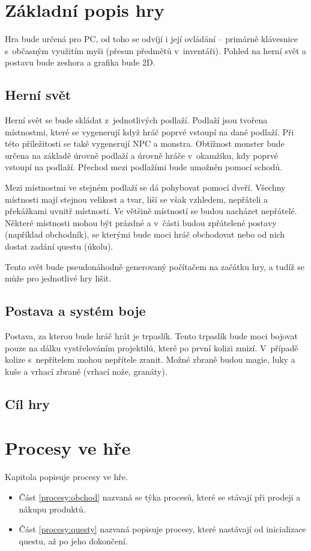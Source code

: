 \documentclass[12pt,a4paper]{article}
\begin{document}

\section{Základní popis hry}
Hra bude určená pro PC, od toho se odvíjí i její ovládání -- primárně klávesnice
s~občasným využitím myši (přesun předmětů v~inventáři). Pohled na herní svět a
postavu bude zeshora a grafika bude 2D.

\subsection{Herní svět}
Herní svět se bude skládat z~jednotlivých podlaží. Podlaží jsou tvořena
místnostmi, které se vygenerují když hráč poprvé vstoupí na dané podlaží. Při
této příležitosti se také vygenerují NPC a monstra. Obtížnost monster bude
určena na základě úrovně podlaží a úrovně hráče v~okamžiku, kdy poprvé vstoupí
na podlaží. Přechod mezi podlažími bude umožněn pomocí schodů.

Mezi místnostmi ve stejném podlaží se dá pohybovat pomocí dveří. Všechny
místnosti mají stejnou velikost a tvar, liší se však vzhledem, nepřáteli a
překážkami uvnitř místnosti. Ve většině místností se budou nacházet nepřátelé.
Některé místnosti mohou být prázdné a v~části budou zpřátelené postavy (například
obchodník), se kterými bude moci hráč obchodovat nebo od nich dostat zadání
questu (úkolu).

Tento svět bude pseudonáhodně generovaný počítačem na začátku hry, a tudíž se
může pro jednotlivé hry lišit.

\subsection{Postava a systém boje}
Postava, za kterou bude hráč hrát je trpaslík. Tento trpaslík bude moci bojovat
pouze na dálku vystřelováním projektilů, které po první kolizi zmizí. V~případě
kolize s~nepřítelem mohou nepřítele zranit. Možné zbraně budou magie, luky a
kuše a vrhací zbraně (vrhací nože, granáty).

\subsection{Cíl hry}




\section{Procesy ve hře}
Kapitola popisuje procesy ve hře.
\begin{itemize}
  \item{Část \ref{procesy:obchod} nazvaná  se týka procesů,
    které se stávají při prodeji a nákupu produktů.}
  \item{Část \ref{procesy:questy} nazvaná  popisuje procesy, které
    nastávají od inicializace questu, až po jeho dokončení.}
\end{itemize}
\end{document}
